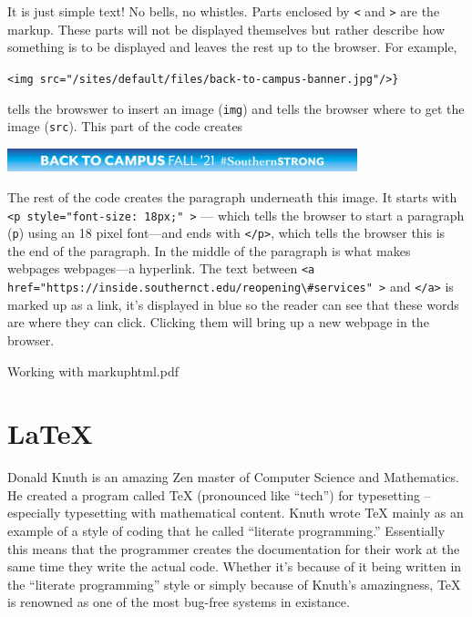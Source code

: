 \noindent It is just simple text! No bells, no whistles. Parts enclosed by \texttt{<}
and \texttt{>} are the markup. These parts will not be displayed themselves
but rather describe how something is to be displayed and leaves the
rest up to the browser. For example,

\begin{center}
\verb+<img src="/sites/default/files/back-to-campus-banner.jpg"/>}+
\par\end{center}

\noindent tells the browswer to insert an image ({\tt img}) and
tells the browser where to get the image ({\tt src}). This part
of the code creates

\begin{center}
\includegraphics[width=4in]{back-to-campus-banner}
\par\end{center}
  
\noindent The rest of the code creates the paragraph underneath this
image. It starts with \verb+<p style="font-size: 18px;" >+ --- which
tells the browser to start a paragraph ({\tt p}) using an 18 pixel
font---and ends with \verb+</p>+, which tells the browser this
is the end of the paragraph. In the middle of the paragraph is what
makes webpages webpages---a hyperlink. The text between 
\verb+<a href="https://inside.southernct.edu/reopening\#services" >+
and \verb+</a>+ is marked up as a link, it's displayed in blue so the reader can see that
these words are where they can click. Clicking them will bring up a new webpage in
the browser.
\clearpage

\begin{worksheet}{1}{Working with markup}{html.pdf}

\end{worksheet}

\section{LaTeX}
\label{sec:latex}

Donald Knuth is an amazing Zen master of Computer Science and Mathematics.  He created a program called \TeX{} (pronounced like ``tech'') for typesetting -- especially typesetting with mathematical content.  Knuth wrote \TeX{} mainly as an example of a style of coding that he called ``literate programming.''  Essentially this means that the programmer creates the documentation for their work at the same time they write the actual code.  Whether it's because of it being written in the ``literate programming'' style or simply because of Knuth's amazingness, \TeX{} is renowned as one of the most bug-free systems in existance. 

